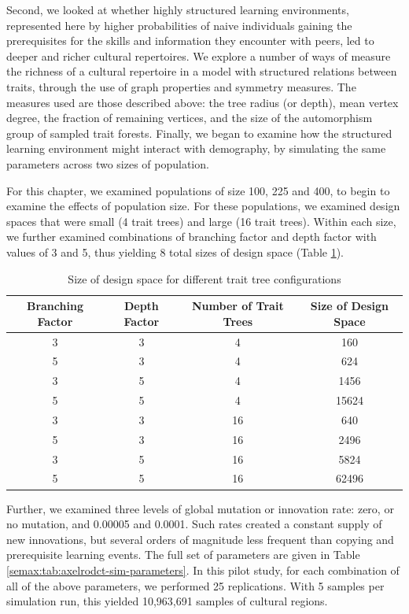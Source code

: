 Second, we looked at whether highly structured learning environments,
represented here by higher probabilities of naive individuals gaining
the prerequisites for the skills and information they encounter with
peers, led to deeper and richer cultural repertoires. We explore a
number of ways of measure the richness of a cultural repertoire in a
model with structured relations between traits, through the use of graph
properties and symmetry measures. The measures used are those described
above: the tree radius (or depth), mean vertex degree, the fraction of
remaining vertices, and the size of the automorphism group of sampled
trait forests. Finally, we began to examine how the structured learning
environment might interact with demography, by simulating the same
parameters across two sizes of population.

For this chapter, we examined populations of size 100, 225 and 400, to
begin to examine the effects of population size. For these populations,
we examined design spaces that were small (4 trait trees) and large (16
trait trees). Within each size, we further examined combinations of
branching factor and depth factor with values of 3 and 5, thus yielding
8 total sizes of design space (Table
\ref{semax:tab:axelrod-design-space-size}).

\begin{table}[H]
\begin{tabular}{|c|c|c|c|}
\hline
\textbf{Branching Factor} & \textbf{Depth Factor} & \textbf{Number of Trait Trees} & \textbf{Size of Design Space}\\ 
\hline
3 & 3 & 4 & 160\\ 
\hline 
5 & 3 & 4 & 624\\ 
\hline 
3 & 5 & 4 & 1456\\ 
\hline 
5 & 5 & 4 & 15624\\ 
\hline 
3 & 3 & 16 & 640\\ 
\hline 
5 & 3 & 16 & 2496\\ 
\hline 
3 & 5 & 16 & 5824\\ 
\hline 
5 & 5 & 16 & 62496\\ 
\hline 
\hline
\end{tabular}
\caption{Size of design space for different trait tree configurations}
\label{semax:tab:axelrod-design-space-size}
\end{table}

Further, we examined three levels of global mutation or innovation rate:
zero, or no mutation, and 0.00005 and 0.0001. Such rates created a
constant supply of new innovations, but several orders of magnitude less
frequent than copying and prerequisite learning events. The full set of
parameters are given in Table \ref{semax:tab:axelrodct-sim-parameters}. In
this pilot study, for each combination of all of the above parameters,
we performed 25 replications. With 5 samples per simulation run, this
yielded 10,963,691 samples of cultural regions.

